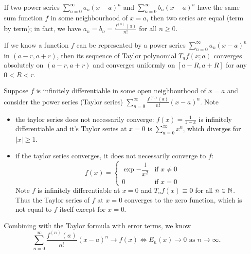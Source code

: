 \documentclass[a4paper]{ctexart}
\begin{document}
    \begin{mythm}
        If two power series $\displaystyle \sum_{n=0}^\infty a_n (x-a)^n$ and $\displaystyle \sum_{n=0}^\infty b_n (x-a)^n$ have the same sum function $f$ in some neighbourhood of $x=a$, then two series are equal (term by term); in fact, we have $a_n = b_n= \displaystyle \frac{f^{(n)}(a)}{n!}$ for all $n\ge 0$.
    \end{mythm}
    \begin{mypro}
        If we know a function $f$ can be represented by a power series $\displaystyle \sum_{n=0}^\infty a_n (x-a)^n$ in $(a-r,a+r)$, then its sequence of Taylor polynomial $T_n f(x;a)$ converges absolutely on $(a-r,a+r)$ and converges uniformly on $[a-R,a+R]$ for any $0<R<r$.
    \end{mypro}
    \begin{myrmk}
        Suppose $f$ is infinitely differentiable in some open neighbourhood of $x=a$ and consider the power series (Taylor series) $\displaystyle \sum_{n=0}^\infty \frac{f^{(n)}(a)}{n!} (x-a)^n$. Note
        \begin{itemize}
            \item the taylor series does not necessarily converge:
            $\displaystyle
            f(x) = \frac1{1-x}  
            $ is infinitely differentiable and it's Taylor series at $x=0$ is $\displaystyle \sum_{n=0}^\infty x^n$, which diverges for $|x|\ge 1$.

            \item if the taylor series converges, it does not necessarily converge to $f$:
            $$
            f(x) = \begin{cases}
            \exp{-\dfrac{1}{x^2}} & \text{if } x\neq 0\\[6pt]
            0 & \text{if } x=0
            \end{cases}
            $$Note $f$ is infinitely differentiable at $x=0$ and $T_n f(x)\equiv 0$ for all $n\in \mathbb{N}$. Thus the Taylor series of $f$ at $x=0$ converges to the zero function, which is not equal to $f$ itself except for $x=0$.
        \end{itemize}
        Combining with the Taylor formula with error terms, we know
        $$ \sum_{n=0}^\infty \frac{f^{(n)}(a)}{n!} (x-a)^n \to f(x) \Leftrightarrow E_n(x) \to 0 \text{ as } n\to \infty. $$
    \end{myrmk}
    
\end{document}
